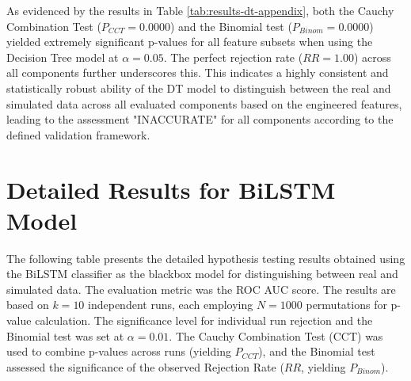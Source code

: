 \begin{appendices}
  As evidenced by the results in Table \ref{tab:results-dt-appendix}, both the Cauchy Combination Test ($P_{CCT}=0.0000$) and the Binomial test ($P_{Binom}=0.0000$) yielded extremely significant p-values for all feature subsets when using the Decision Tree model at $\alpha=0.05$. The perfect rejection rate ($RR=1.00$) across all components further underscores this. This indicates a highly consistent and statistically robust ability of the DT model to distinguish between the real and simulated data across all evaluated components based on the engineered features, leading to the assessment "INACCURATE" for all components according to the defined validation framework.
  \section{Detailed Results for BiLSTM Model}
  \label{sec:lstm_results_appendix}

  The following table presents the detailed hypothesis testing results obtained using the BiLSTM classifier as the blackbox model for distinguishing between real and simulated data. The evaluation metric was the ROC AUC score. The results are based on $k=10$ independent runs, each employing $N=1000$ permutations for p-value calculation. The significance level for individual run rejection and the Binomial test was set at $\alpha=0.01$. The Cauchy Combination Test (CCT) was used to combine p-values across runs (yielding $P_{CCT}$), and the Binomial test assessed the significance of the observed Rejection Rate ($RR$, yielding $P_{Binom}$).


\end{appendices}
